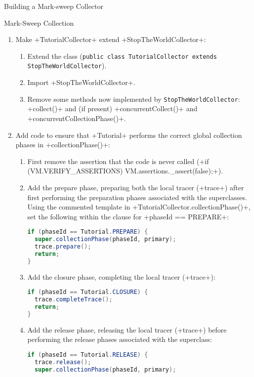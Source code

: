 \begin{section}{Building a Mark-sweep Collector}
\begin{subsection}{Mark-Sweep Collection}
\begin{enumerate}
    \begin{enumerate}
      \item Make \spverb+TutorialCollector+ extend \spverb+StopTheWorldCollector+:
        \begin{enumerate}
          \item Extend the class (\texttt{public class Tutorial\-Collector ex\-tends Stop\-The\-World\-Collector}).
          \item Import \spverb+StopTheWorldCollector+.
          \item Remove some methods now implemented by \texttt{Stop\-The\-World\-Col\-lec\-tor}: \spverb+collect()+ and (if present) \spverb+concurrentCollect()+ and \newline \spverb+concurrentCollectionPhase()+.
        \end{enumerate}
      \item Add code to ensure that \spverb+Tutorial+ performs the correct global collection phases in \spverb+collectionPhase()+:
        \begin{enumerate}
           \item First remove the assertion that the code is never called (\spverb+if (VM.VERIFY_ASSERTIONS) VM.assertions._assert(false);+).
           \item Add the prepare phase, preparing both the local tracer (\spverb+trace+) after first performing the preparation phases associated with the superclasses. Using the commented template in \spverb+TutorialCollector.collectionPhase()+, set the following within the clause for \spverb+phaseId == PREPARE+:
             \begin{lstlisting}[language=Java]
if (phaseId == Tutorial.PREPARE) {
  super.collectionPhase(phaseId, primary);
  trace.prepare();
  return;
}
             \end{lstlisting}
           \item Add the closure phase, completing the local tracer (\spverb+trace+):
             \begin{lstlisting}[language=Java]
if (phaseId == Tutorial.CLOSURE) {
  trace.completeTrace();
  return;
}
             \end{lstlisting}
           \item Add the release phase, releasing the local tracer (\spverb+trace+) before performing the release phases associated with the superclass:
             \begin{lstlisting}[language=Java]
if (phaseId == Tutorial.RELEASE) {
  trace.release();
  super.collectionPhase(phaseId, primary);

\end{lstlisting}
\end{enumerate}
\end{enumerate}
\end{enumerate}
\end{subsection}
\end{section}
